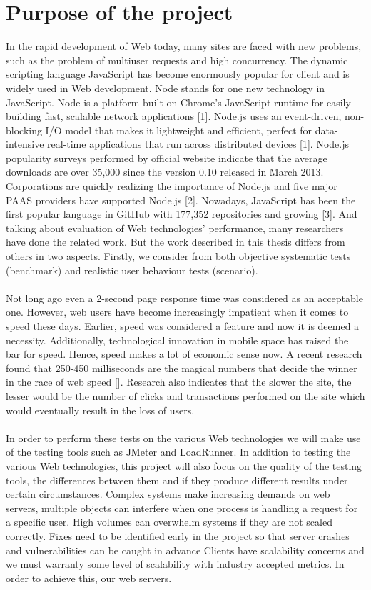 \documentclass[a4paper, onecolumn, oneside, 11pt, wide, floatssmall]{mwrep}
\begin{document}
\section{Purpose of the project}
In the rapid development of Web today, many sites are faced with new problems, such as the problem of multiuser requests and high concurrency. The dynamic scripting language JavaScript has become enormously popular for client and is widely used in Web development. Node stands for one new technology in JavaScript. Node is a platform built on Chrome's JavaScript runtime for easily building fast, scalable network applications [1]. Node.js uses an event-driven, non- blocking I/O model that makes it lightweight and efficient, perfect for data-intensive real-time applications that run across distributed devices [1]. Node.js popularity surveys performed by official website indicate that the average downloads are over 35,000 since the version 0.10 released in March 2013. Corporations are quickly realizing the importance of Node.js and five major PAAS providers have supported Node.js [2]. Nowadays, JavaScript has been the first popular language in GitHub with 177,352 repositories and growing [3]. And talking about evaluation of Web technologies’ performance, many researchers have done the related work. But the work described in this thesis differs from others in two aspects. Firstly, we consider from both objective systematic tests (benchmark) and realistic user behaviour tests (scenario).
\paragraph{}
Not long ago even a 2-second page response time was considered as an acceptable one. However, web users have become increasingly impatient when it comes to speed these days. Earlier, speed was considered a feature and now it is deemed a necessity. Additionally, technological innovation in mobile space has raised the bar for speed. Hence, speed makes a lot of economic sense now. A recent research found that 250-450 milliseconds are the magical numbers that decide the winner in the race of web speed []. Research also indicates that the slower the site, the lesser would be the number of clicks and transactions performed on the site which would eventually result in the loss of users.
\paragraph{}
In order to perform these tests on the various Web technologies we will make use of the testing tools such as JMeter and LoadRunner. In addition to testing the various Web technologies, this project will also focus on the quality of the testing tools, the differences between them and if they produce different results under certain circumstances. Complex systems make increasing demands on web servers, multiple objects can interfere when one process is handling a request for a specific user. High volumes can overwhelm systems if they are not scaled correctly. Fixes need to be identified early in the project so that server crashes and vulnerabilities can be caught in advance Clients have scalability concerns and we must warranty some level of scalability with industry accepted metrics. In order to achieve this, our web servers.
\end{document}
